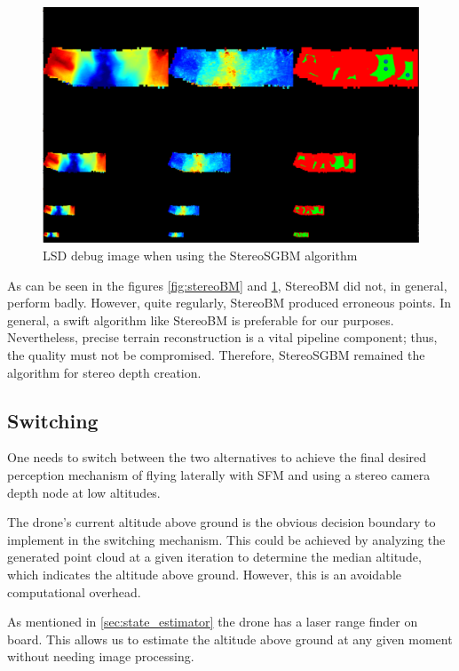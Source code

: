 \begin{figure}[h]
\centering
\includegraphics[scale=0.23]{images/stereo_camera_depth/stereoSGBM.png}
\caption{LSD debug image when using the StereoSGBM algorithm}
\label{fig:stereoSGBM}
\end{figure}

As can be seen in the figures \cref{fig:stereoBM} and \cref{fig:stereoSGBM}, StereoBM did not, in general, perform badly. However, quite regularly, StereoBM produced erroneous points. In general, a swift algorithm like StereoBM is preferable for our purposes. Nevertheless, precise terrain reconstruction is a vital pipeline component; thus, the quality must not be compromised. Therefore, StereoSGBM remained the algorithm for stereo depth creation.
\clearpage %

\subsection{Switching}\label{subsec:switching}

One needs to switch between the two alternatives to achieve the final desired perception mechanism of flying laterally with SFM and using a stereo camera depth node at low altitudes.

The drone's current altitude above ground is the obvious decision boundary to implement in the switching mechanism. This could be achieved by analyzing the generated point cloud at a given iteration to determine the median altitude, which indicates the altitude above ground. However, this is an avoidable computational overhead.

As mentioned in \cref{sec:state_estimator} the drone has a laser range finder on board. This allows us to estimate the altitude above ground at any given moment without needing image processing.

